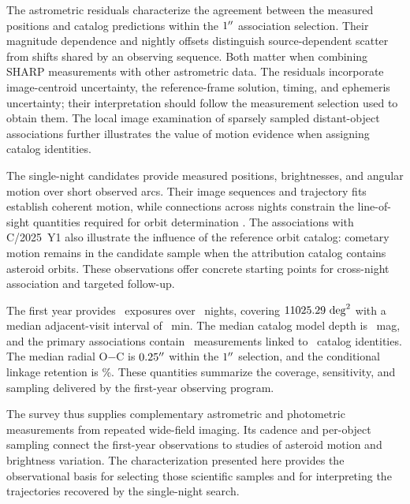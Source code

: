 The astrometric residuals characterize the agreement between the measured
positions and catalog predictions within the $1^{\prime\prime}$ association
selection. Their magnitude dependence and nightly offsets distinguish
source-dependent scatter from shifts shared by an observing sequence.
Both matter when combining SHARP measurements with other astrometric
data. The residuals incorporate image-centroid uncertainty, the
reference-frame solution, timing, and ephemeris uncertainty; their
interpretation should follow the measurement selection used to obtain
them. The local image examination of sparsely sampled distant-object
associations further illustrates the value of motion evidence when
assigning catalog identities.

The single-night candidates provide measured positions, brightnesses,
and angular motion over short observed arcs. Their image sequences and
trajectory fits establish coherent motion, while connections across
nights constrain the line-of-sight quantities required for orbit
determination \citep{Kubica2007,Holman2018,Moeyens2021}. The associations
with C/2025~Y1 also illustrate the influence of the reference orbit
catalog: cometary motion remains in the candidate sample when the
attribution catalog contains asteroid orbits. These observations offer
concrete starting points for cross-night association and targeted
follow-up.


The first year provides \yrNexp\ exposures over \yrNnight\ nights,
covering $11025.29~\mathrm{deg}^{2}$ with a median adjacent-visit interval
of \yrCadence~min. The median catalog model depth is \yrDepth~mag,
and the primary associations contain \yrNAssoc\ measurements
linked to \yrNKnown\ catalog identities. The median radial
O$-$C is $0.25^{\prime\prime}$ within the $1^{\prime\prime}$ selection, and the
conditional linkage retention is \yrRetention\%. These quantities
summarize the coverage, sensitivity, and sampling delivered by the
first-year observing program.

The survey thus supplies complementary astrometric and photometric
measurements from repeated wide-field imaging. Its cadence and
per-object sampling connect the first-year observations to studies of
asteroid motion and brightness variation. The characterization presented
here provides the observational basis for selecting those scientific
samples and for interpreting the trajectories recovered by the
single-night search.
